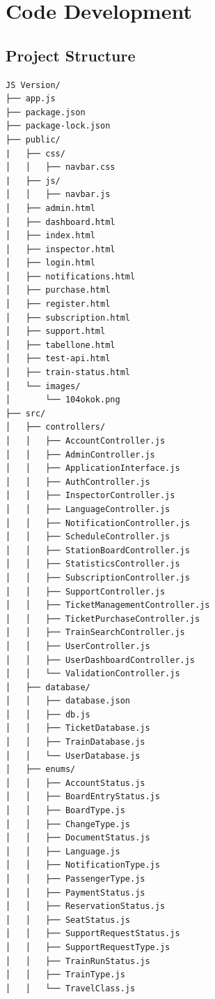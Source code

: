 \documentclass{article}
\begin{document}
\section{Code Development}
\subsection{Project Structure}

\noindent
\begin{minipage}[t]{0.48\textwidth}
\footnotesize
\begin{verbatim}
JS Version/
├── app.js
├── package.json
├── package-lock.json
├── public/
|   ├── css/
│   │   ├── navbar.css
|   ├── js/
│   │   ├── navbar.js
│   ├── admin.html
│   ├── dashboard.html
│   ├── index.html
│   ├── inspector.html
│   ├── login.html
│   ├── notifications.html
│   ├── purchase.html
│   ├── register.html
│   ├── subscription.html
│   ├── support.html
│   ├── tabellone.html
│   ├── test-api.html
│   ├── train-status.html
│   └── images/
│       └── 104okok.png
├── src/
│   ├── controllers/
│   │   ├── AccountController.js
│   │   ├── AdminController.js
│   │   ├── ApplicationInterface.js
│   │   ├── AuthController.js
│   │   ├── InspectorController.js
│   │   ├── LanguageController.js
│   │   ├── NotificationController.js
│   │   ├── ScheduleController.js
│   │   ├── StationBoardController.js
│   │   ├── StatisticsController.js
│   │   ├── SubscriptionController.js
│   │   ├── SupportController.js
│   │   ├── TicketManagementController.js
│   │   ├── TicketPurchaseController.js
│   │   ├── TrainSearchController.js
│   │   ├── UserController.js
│   │   ├── UserDashboardController.js
│   │   └── ValidationController.js
│   ├── database/
│   │   ├── database.json
│   │   ├── db.js
│   │   ├── TicketDatabase.js
│   │   ├── TrainDatabase.js
│   │   └── UserDatabase.js
│   ├── enums/
│   │   ├── AccountStatus.js
│   │   ├── BoardEntryStatus.js
│   │   ├── BoardType.js
│   │   ├── ChangeType.js
│   │   ├── DocumentStatus.js
│   │   ├── Language.js
│   │   ├── NotificationType.js
│   │   ├── PassengerType.js
│   │   ├── PaymentStatus.js
│   │   ├── ReservationStatus.js
│   │   ├── SeatStatus.js
│   │   ├── SupportRequestStatus.js
│   │   ├── SupportRequestType.js
│   │   ├── TrainRunStatus.js
│   │   ├── TrainType.js
│   │   └── TravelClass.js
\end{verbatim}
\end{minipage}%
\hfill
\end{document}
